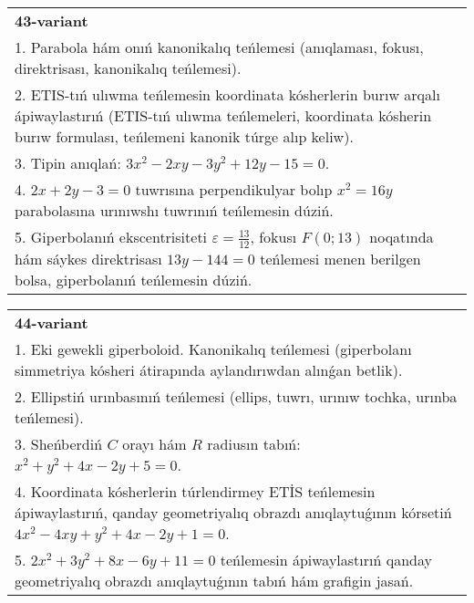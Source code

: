 \documentclass{article}
\begin{document}
\begin{tabular}{m{17cm}}
\textbf{43-variant}\\
1. Parabola hám onıń kanonikalıq teńlemesi (anıqlaması, fokusı, direktrisası, kanonikalıq teńlemesi).\\

2. ETIS-tıń ulıwma teńlemesin koordinata kósherlerin burıw arqalı ápiwaylastırıń (ETIS-tıń ulıwma teńlemeleri, koordinata kósherin burıw formulası, teńlemeni kanonik túrge alıp keliw).\\

3. Tipin anıqlań: $3 x^{2}-2 xy-3 y^{2}+12 y-15=0$.\\

4. $2x + 2y - 3 = 0$ tuwrısına perpendikulyar bolıp $x^{2} = 16y$ parabolasına urınıwshı tuwrınıń teńlemesin dúziń.  \\

5. Giperbolanıń ekscentrisiteti $\varepsilon = \frac{13}{12}$, fokusı $F(0;13)$ noqatında hám sáykes direktrisası $13y - 144 = 0$ teńlemesi menen berilgen bolsa, giperbolanıń teńlemesin dúziń.  
\end{tabular}
\vspace{1cm}


\begin{tabular}{m{17cm}}
\textbf{44-variant}\\
1. Eki gewekli giperboloid. Kanonikalıq teńlemesi (giperbolanı simmetriya kósheri átirapında aylandırıwdan alınǵan betlik).\\

2. Ellipstiń urınbasınıń teńlemesi (ellips, tuwrı, urınıw tochka, urınba teńlemesi).\\

3. Sheńberdiń $C$ orayı hám $R$ radiusın tabıń: $x^2+y^2+4 x-2 y+5=0$.\\

4. Koordinata kósherlerin túrlendirmey ETİS teńlemesin ápiwaylastırıń, qanday geometriyalıq obrazdı anıqlaytuǵının kórsetiń $4x^{2} - 4xy + y^{2} + 4x - 2y + 1 = 0$.  \\

5. $2x^{2} + 3y^{2} + 8x - 6y + 11 = 0$ teńlemesin ápiwaylastırıń qanday geometriyalıq obrazdı anıqlaytuǵının tabıń hám grafigin jasań.  
\end{tabular}
\vspace{1cm}
\end{document}

